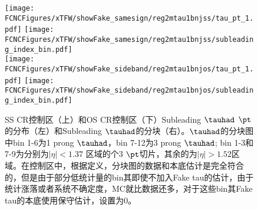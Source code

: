 \begin{figure}[H]
\centering
\texttt{[image: \\FCNCFigures/xTFW/showFake\_samesign/reg2mtau1bnjss/tau\_pt\_1.pdf]}
\texttt{[image: \\FCNCFigures/xTFW/showFake\_samesign/reg2mtau1bnjss/subleading\_index\_bin.pdf]}\\
\texttt{[image: \\FCNCFigures/xTFW/showFake\_sideband/reg2mtau1bnjos/tau\_pt\_1.pdf]}
\texttt{[image: \\FCNCFigures/xTFW/showFake\_sideband/reg2mtau1bnjos/subleading\_index\_bin.pdf]}
\caption{SS CR控制区（上）和OS CR控制区（下）Subleading $\tauhad$ $\pt$的分布（左）和Subleading $\tauhad$的分块（右）。$\tauhad$的分块图中bin 1-6为1 prong $\tauhad$，bin 7-12为3 prong $\tauhad$; bin 1-3和7-9为分别为$|\eta|<1.37$ 区域的个3 $\pt$切片，其余的为$|\eta|>1.52$区域。在控制区中，根据定义，分块图的数据和本底估计是完全符合的，但是由于部分低统计量的bin其即使不加入Fake tau的估计，由于统计涨落或者系统不确定度，MC就比数据还多，对于这些bin其Fake tau的本底使用保守估计，设置为0。}
\label{fig:ffsys}
\end{figure}

